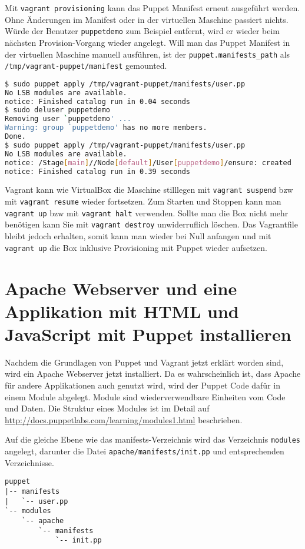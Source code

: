\documentclass[12pt,a4paper,ngerman]{article}
\begin{document}
Mit \lstinline$vagrant provisioning$ kann das Puppet Manifest erneut ausgeführt werden. Ohne Änderungen im Manifest oder in der virtuellen Maschine passiert nichts. Würde der Benutzer \lstinline$puppetdemo$ zum Beispiel entfernt, wird er wieder beim nächsten Provision-Vorgang wieder angelegt.
Will man das Puppet Manifest in der virtuellen Maschine manuell ausführen, ist der \lstinline$puppet.manifests_path$ als \lstinline$/tmp/vagrant-puppet/manifest$ gemounted.

\begin{lstlisting}[language=sh,caption=Puppet apply im Box, label=vagrant-apply]
$ sudo puppet apply /tmp/vagrant-puppet/manifests/user.pp
No LSB modules are available.
notice: Finished catalog run in 0.04 seconds
$ sudo deluser puppetdemo
Removing user `puppetdemo' ...
Warning: group `puppetdemo' has no more members.
Done.
$ sudo puppet apply /tmp/vagrant-puppet/manifests/user.pp
No LSB modules are available.
notice: /Stage[main]//Node[default]/User[puppetdemo]/ensure: created
notice: Finished catalog run in 0.39 seconds
\end{lstlisting}

Vagrant kann wie VirtualBox die Maschine stilllegen mit \lstinline$vagrant suspend$ bzw mit \lstinline$vagrant resume$ wieder fortsetzen. Zum Starten und Stoppen kann man \lstinline$vagrant up$ bzw mit \lstinline$vagrant halt$ verwenden.  Sollte man die Box nicht mehr benötigen kann Sie mit \lstinline$vagrant destroy$ unwiderruflich löschen. Das Vagrantfile bleibt jedoch erhalten, somit kann man wieder bei Null anfangen und mit \lstinline$vagrant up$ die Box inklusive Provisioning mit Puppet wieder aufsetzen.

\section{Apache Webserver und eine Applikation mit HTML und JavaScript mit Puppet installieren}
Nachdem die Grundlagen von Puppet und Vagrant jetzt erklärt worden sind, wird ein Apache Webserver jetzt installiert. Da es wahrscheinlich ist, dass Apache für andere Applikationen auch genutzt wird, wird der Puppet Code dafür in einem Module abgelegt. Module sind wiederverwendbare Einheiten vom Code und Daten. Die Struktur eines Modules ist im Detail auf \url{http://docs.puppetlabs.com/learning/modules1.html} beschrieben.


Auf die gleiche Ebene wie das manifests-Verzeichnis wird das Verzeichnis \lstinline$modules$ angelegt, darunter die Datei \lstinline$apache/manifests/init.pp$ und entsprechenden Verzeichnisse.
\begin{lstlisting}[language=tree,caption=Verzeichnisstruktur für den apache-Module, label=apache-module]
puppet
|-- manifests
|   `-- user.pp
`-- modules
    `-- apache
        `-- manifests
            `-- init.pp
\end{lstlisting}
\end{document}
